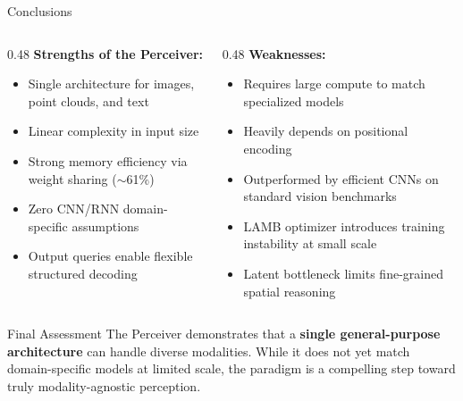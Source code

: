 \documentclass[aspectratio=169,11pt]{beamer}
\begin{document}
\begin{frame}[shrink=15]{Conclusions}
  \begin{columns}[T]
    \begin{column}{0.48\textwidth}
      \textbf{Strengths of the Perceiver:}
      \begin{itemize}
        \item Single architecture for images, point clouds, and text
        \item Linear complexity in input size
        \item Strong memory efficiency via weight sharing ($\sim$61\%)
        \item Zero CNN/RNN domain-specific assumptions
        \item Output queries enable flexible structured decoding
      \end{itemize}
    \end{column}
    \begin{column}{0.48\textwidth}
      \textbf{Weaknesses:}
      \begin{itemize}
        \item Requires large compute to match specialized models
        \item Heavily depends on positional encoding
        \item Outperformed by efficient CNNs on standard vision benchmarks
        \item LAMB optimizer introduces training instability at small scale
        \item Latent bottleneck limits fine-grained spatial reasoning
      \end{itemize}
    \end{column}
  \end{columns}

  \vspace{0.5em}
  \begin{exampleblock}{Final Assessment}
    The Perceiver demonstrates that a \textbf{single general-purpose architecture} can handle diverse modalities. While it does not yet match domain-specific models at limited scale, the paradigm is a compelling step toward truly modality-agnostic perception.
  \end{exampleblock}
\end{frame}

\end{document}
